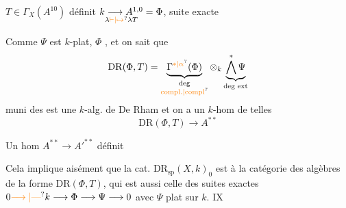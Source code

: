$T\in\Gamma_X(A^{10})$ définit $\underset{\lambda\unsure{\vdash|\mapsto}\lambda T}{k\longrightarrow A^{1,0}}=\Phi$,  suite exacte

Comme $\Psi$ est $k$-plat, $\Phi$ , et on sait que
\[
 \mathrm{DR}(\Phi,T)=\underbrace{\Gamma^{\unsure{*|\alpha}}(\Phi)}_{\substack{\text{deg}\\\text{\unsure{compl.|compl}}}}\otimes_k
 \underbrace{\bigwedge^{*}\Psi}_{\text{deg ext}}
\]
muni des   est une $k$-alg. de De Rham  et on a un $k$-hom  de telles
\[
 \mathrm{DR}(\Phi,T)\longrightarrow A^{**}
\]

Un hom $A^{**}\longrightarrow {A'}^{**}$ définit 

Cela implique aisément que la cat.  $\mathrm{DR}_{\mathrm{sp}}(X,k)_0$ est  à la  catégorie   des algèbres de la forme $\mathrm{DR}(\Phi,T)$, qui est aussi celle des suites exactes $0\unsure{\longrightarrow|\text{---}} k\longrightarrow\Phi\longrightarrow\Psi\longrightarrow0$ avec $\Psi$ plat sur $k$.
\hfill IX

